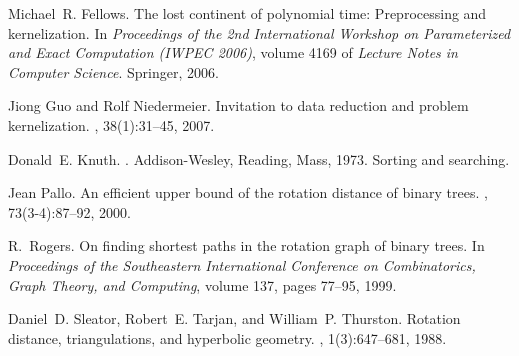 \documentclass[12pt]{article}
\begin{document}
\begin{thebibliography}{10}
Michael~R. Fellows.
\newblock The lost continent of polynomial time: Preprocessing and
  kernelization.
\newblock In {\em Proceedings of the 2nd International Workshop on
  Parameterized and Exact Computation (IWPEC 2006)}, volume 4169 of {\em
  Lecture Notes in Computer Science}. Springer, 2006.

Jiong Guo and Rolf Niedermeier.
\newblock Invitation to data reduction and problem kernelization.
, 38(1):31--45, 2007.

Donald~E. Knuth.
.
\newblock Addison-Wesley, Reading, Mass, 1973.
\newblock Sorting and searching.

Jean Pallo.
\newblock An efficient upper bound of the rotation distance of binary trees.
, 73(3-4):87--92, 2000.

R.~Rogers.
\newblock On finding shortest paths in the rotation graph of binary trees.
\newblock In {\em Proceedings of the Southeastern International Conference on
  Combinatorics, Graph Theory, and Computing}, volume 137, pages 77--95, 1999.

Daniel~D. Sleator, Robert~E. Tarjan, and William~P. Thurston.
\newblock Rotation distance, triangulations, and hyperbolic geometry.
, 1(3):647--681,
  1988.

\end{thebibliography}


 
\end{document}

